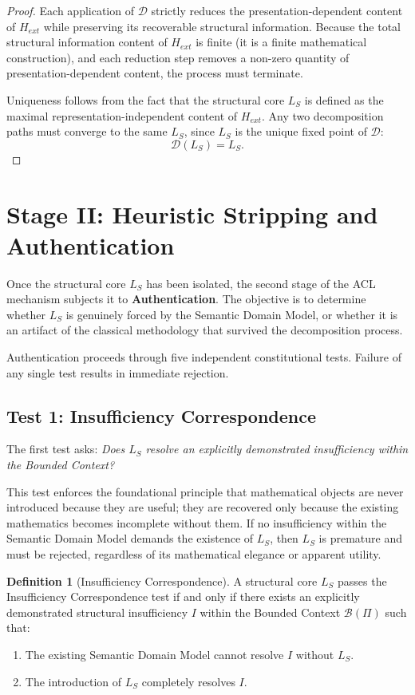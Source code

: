 \documentclass[12pt,openany]{extbook}
\theoremstyle{plain}
\theoremstyle{definition}
\newtheorem{definition}{Definition}[chapter]
\begin{document}
\begin{proof}
Each application of $\mathcal{D}$ strictly reduces the presentation-dependent content of $H_{ext}$ while preserving its recoverable structural information. Because the total structural information content of $H_{ext}$ is finite (it is a finite mathematical construction), and each reduction step removes a non-zero quantity of presentation-dependent content, the process must terminate. 

Uniqueness follows from the fact that the structural core $L_S$ is defined as the maximal representation-independent content of $H_{ext}$. Any two decomposition paths must converge to the same $L_S$, since $L_S$ is the unique fixed point of $\mathcal{D}$:
\[
\mathcal{D}(L_S) = L_S.
\]
\end{proof}

\section{Stage II: Heuristic Stripping and Authentication}

Once the structural core $L_S$ has been isolated, the second stage of the ACL mechanism subjects it to \textbf{Authentication}. The objective is to determine whether $L_S$ is genuinely forced by the Semantic Domain Model, or whether it is an artifact of the classical methodology that survived the decomposition process.

Authentication proceeds through five independent constitutional tests. Failure of any single test results in immediate rejection.

\subsection{Test 1: Insufficiency Correspondence}

The first test asks: \emph{Does $L_S$ resolve an explicitly demonstrated insufficiency within the Bounded Context?}

This test enforces the foundational principle that mathematical objects are never introduced because they are useful; they are recovered only because the existing mathematics becomes incomplete without them. If no insufficiency within the Semantic Domain Model demands the existence of $L_S$, then $L_S$ is premature and must be rejected, regardless of its mathematical elegance or apparent utility.

\begin{definition}[Insufficiency Correspondence]
A structural core $L_S$ passes the Insufficiency Correspondence test if and only if there exists an explicitly demonstrated structural insufficiency $I$ within the Bounded Context $\mathcal{B}(\Pi)$ such that:
\begin{enumerate}
    \item The existing Semantic Domain Model cannot resolve $I$ without $L_S$.
    \item The introduction of $L_S$ completely resolves $I$.
\end{enumerate}
\end{definition}
\end{document}
